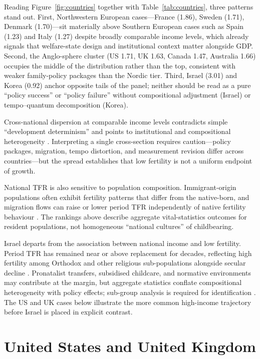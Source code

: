 \documentclass[11pt,a4paper,openany]{book}
\begin{document}


Reading Figure~\ref{fig:countries} together with Table~\ref{tab:countries}, three patterns stand out. First, Northwestern European cases---France (1.86), Sweden (1.71), Denmark (1.70)---sit materially above Southern European cases such as Spain (1.23) and Italy (1.27) despite broadly comparable income levels, which already signals that welfare-state design and institutional context matter alongside GDP. Second, the Anglo-sphere cluster (US 1.71, UK 1.63, Canada 1.47, Australia 1.66) occupies the middle of the distribution rather than the top, consistent with weaker family-policy packages than the Nordic tier. Third, Israel (3.01) and Korea (0.92) anchor opposite tails of the panel; neither should be read as a pure ``policy success'' or ``policy failure'' without compositional adjustment (Israel) or tempo--quantum decomposition (Korea).

Cross-national dispersion at comparable income levels contradicts simple ``development determinism'' and points to institutional and compositional heterogeneity \citep{myrskyla2009,frejka2017}. Interpreting a single cross-section requires caution---policy packages, migration, tempo distortion, and measurement revision differ across countries---but the spread establishes that low fertility is not a uniform endpoint of growth.

National TFR is also sensitive to population composition. Immigrant-origin populations often exhibit fertility patterns that differ from the native-born, and migration flows can raise or lower period TFR independently of native fertility behaviour \citep{sobotka2008}. The rankings above describe aggregate vital-statistics outcomes for resident populations, not homogeneous ``national cultures'' of childbearing.

Israel departs from the association between national income and low fertility. Period TFR has remained near or above replacement for decades, reflecting high fertility among Orthodox and other religious sub-populations alongside secular decline \citep{okun2013,hleihel2017}. Pronatalist transfers, subsidised childcare, and normative environments may contribute at the margin, but aggregate statistics conflate compositional heterogeneity with policy effects; sub-group analysis is required for identification \citep{okun2013}. The US and UK cases below illustrate the more common high-income trajectory before Israel is placed in explicit contrast.

\section{United States and United Kingdom}
\end{document}
